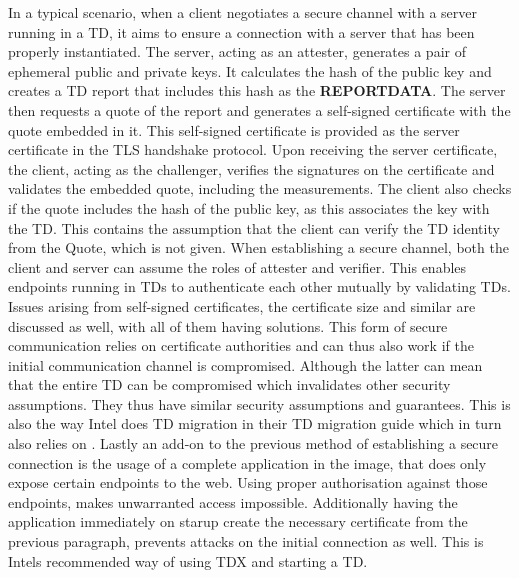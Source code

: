 In a typical scenario, when a client negotiates a secure channel with a server running in a TD, it aims to ensure a connection with a server that has been properly instantiated. The server, acting as an attester, generates a pair of ephemeral public and private keys. It calculates the hash of the public key and creates a TD report that includes this hash as the \textbf{REPORTDATA}. The server then requests a quote of the report and generates a self-signed certificate with the quote embedded in it. This self-signed certificate is provided as the server certificate in the TLS handshake protocol. Upon receiving the server certificate, the client, acting as the challenger, verifies the signatures on the certificate and validates the embedded quote, including the measurements. The client also checks if the quote includes the hash of the public key, as this associates the key with the TD. This contains the assumption that the client can verify the TD identity from the Quote, which is not given. When establishing a secure channel, both the client and server can assume the roles of attester and verifier. This enables endpoints running in TDs to authenticate each other mutually by validating TDs\cite{knauth_integrating_2019}. Issues arising from self-signed certificates, the certificate size and similar are discussed as well, with all of them  having solutions. This form of secure communication relies on certificate authorities and can thus also work if the initial communication channel is compromised. Although the latter can mean that the entire TD can be compromised which invalidates other security assumptions. They thus have similar security assumptions and guarantees. This is also the way Intel does TD migration in their  TD migration guide\cite{intel_corporation_td_migration_design_2023} which in turn also relies on \cite{knauth_integrating_2019}.
Lastly an add-on to the previous method of establishing a secure connection is the usage of a complete application in the image, that does only expose certain endpoints to the web. Using proper authorisation against those endpoints, makes unwarranted access impossible. Additionally having the application immediately on starup create the necessary certificate from the previous paragraph, prevents attacks on the initial connection as well. This is Intels recommended way of using TDX and starting a TD. 
